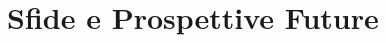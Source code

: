 \documentclass[12pt,a4paper,openright,twoside]{book}
\begin{document}
\section{Sfide e Prospettive Future}


%



\backmatter

\nocite{*} %



\end{document}

